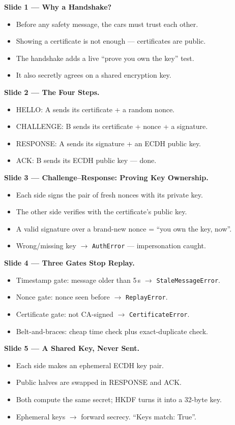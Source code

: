 \documentclass[11pt,a4paper]{article}
\begin{document}
\textbf{Slide 1 --- Why a Handshake?}
\begin{itemize}
  \item Before any safety message, the cars must trust each other.
  \item Showing a certificate is not enough --- certificates are public.
  \item The handshake adds a live ``prove you own the key'' test.
  \item It also secretly agrees on a shared encryption key.
\end{itemize}

\textbf{Slide 2 --- The Four Steps.}
\begin{itemize}
  \item HELLO: A sends its certificate + a random nonce.
  \item CHALLENGE: B sends its certificate + nonce + a signature.
  \item RESPONSE: A sends its signature + an ECDH public key.
  \item ACK: B sends its ECDH public key --- done.
\end{itemize}

\textbf{Slide 3 --- Challenge--Response: Proving Key Ownership.}
\begin{itemize}
  \item Each side signs the pair of fresh nonces with its private key.
  \item The other side verifies with the certificate's public key.
  \item A valid signature over a brand-new nonce = ``you own the key, now''.
  \item Wrong/missing key $\to$ \texttt{AuthError} --- impersonation caught.
\end{itemize}

\textbf{Slide 4 --- Three Gates Stop Replay.}
\begin{itemize}
  \item Timestamp gate: message older than 5\,s $\to$ \texttt{StaleMessageError}.
  \item Nonce gate: nonce seen before $\to$ \texttt{ReplayError}.
  \item Certificate gate: not CA-signed $\to$ \texttt{CertificateError}.
  \item Belt-and-braces: cheap time check plus exact-duplicate check.
\end{itemize}

\textbf{Slide 5 --- A Shared Key, Never Sent.}
\begin{itemize}
  \item Each side makes an ephemeral ECDH key pair.
  \item Public halves are swapped in RESPONSE and ACK.
  \item Both compute the same secret; HKDF turns it into a 32-byte key.
  \item Ephemeral keys $\to$ forward secrecy. ``Keys match: True''.
\end{itemize}
\end{document}
